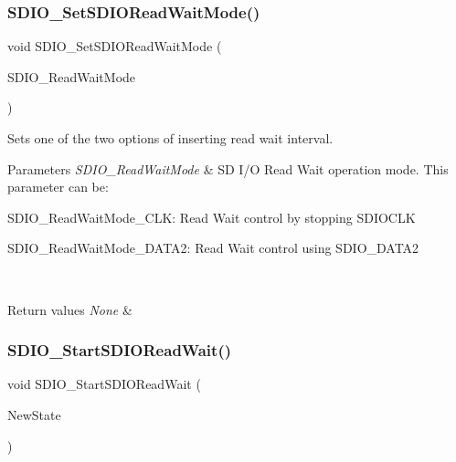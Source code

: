 \subsubsection{\texorpdfstring{SDIO\_SetSDIOReadWaitMode()}{SDIO\_SetSDIOReadWaitMode()}}
{\footnotesize\ttfamily void S\+D\+I\+O\+\_\+\+Set\+S\+D\+I\+O\+Read\+Wait\+Mode (\begin{DoxyParamCaption}\item[{uint32\+\_\+t}]{S\+D\+I\+O\+\_\+\+Read\+Wait\+Mode }\end{DoxyParamCaption})}



Sets one of the two options of inserting read wait interval. 


\begin{DoxyParams}{Parameters}
{\em S\+D\+I\+O\+\_\+\+Read\+Wait\+Mode} & SD I/O Read Wait operation mode. This parameter can be\+: \begin{DoxyItemize}
\item S\+D\+I\+O\+\_\+\+Read\+Wait\+Mode\+\_\+\+C\+LK\+: Read Wait control by stopping S\+D\+I\+O\+C\+LK \item S\+D\+I\+O\+\_\+\+Read\+Wait\+Mode\+\_\+\+D\+A\+T\+A2\+: Read Wait control using S\+D\+I\+O\+\_\+\+D\+A\+T\+A2 \end{DoxyItemize}
\\
\hline
\end{DoxyParams}

\begin{DoxyRetVals}{Return values}
{\em None} & \\
\hline
\end{DoxyRetVals}
\mbox{\label{group___s_d_i_o___exported___functions_gac88f914d9a68a83abc2265ec8a7b79fc}} 
\subsubsection{\texorpdfstring{SDIO\_StartSDIOReadWait()}{SDIO\_StartSDIOReadWait()}}
{\footnotesize\ttfamily void S\+D\+I\+O\+\_\+\+Start\+S\+D\+I\+O\+Read\+Wait (\begin{DoxyParamCaption}\item[{\mbox{\hyperlink{group___exported__types_gac9a7e9a35d2513ec15c3b537aaa4fba1}{Functional\+State}}}]{New\+State }\end{DoxyParamCaption})}



